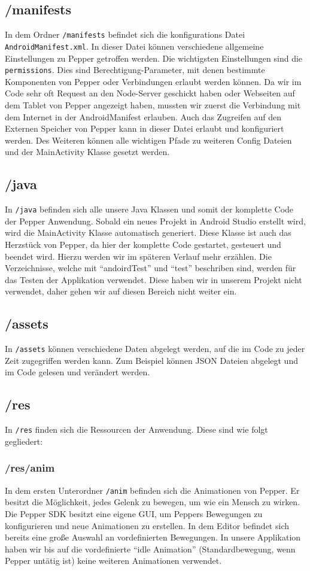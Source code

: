 \subsection*{/manifests}
In dem Ordner \verb|/manifests| befindet sich die konfigurations Datei \verb|AndroidManifest.xml|. In dieser Datei können verschiedene allgemeine Einstellungen zu Pepper getroffen werden. Die wichtigsten Einstellungen sind die \verb|permissions|. Dies sind Berechtigung-Parameter, mit denen bestimmte Komponenten von Pepper oder Verbindungen erlaubt werden können. Da wir im Code sehr oft Request an den Node-Server geschickt haben oder Webseiten auf dem Tablet von Pepper angezeigt haben, mussten wir zuerst die Verbindung mit dem Internet in der AndroidManifest erlauben. Auch das Zugreifen auf den Externen Speicher von Pepper kann in dieser Datei erlaubt und konfiguriert werden. Des Weiteren können alle wichtigen Pfade zu weiteren Config Dateien und der MainActivity Klasse gesetzt werden.

\subsection*{/java}
In  \verb|/java| befinden sich alle unsere Java Klassen und somit der komplette Code der Pepper Anwendung. Sobald ein neues Projekt in Android Studio erstellt wird, wird die MainActivity Klasse automatisch generiert. Diese Klasse ist auch das Herzstück von Pepper, da hier der komplette Code gestartet, gesteuert und beendet wird. Hierzu werden wir im späteren Verlauf mehr erzählen. Die Verzeichnisse, welche mit ``andoirdTest'' und ``test'' beschriben sind, werden für das Testen der Applikation verwendet. Diese haben wir in unserem Projekt nicht verwendet, daher gehen wir auf diesen Bereich nicht weiter ein.

\subsection*{/assets}
In \verb|/assets| können verschiedene Daten abgelegt werden, auf die im Code zu jeder Zeit zugegriffen werden kann. Zum Beispiel können JSON Dateien abgelegt und im Code gelesen und verändert werden.

\subsection*{/res}
In \verb|/res| finden sich die Ressourcen der Anwendung. Diese sind wie folgt gegliedert:

\subsubsection*{/res/anim}
In dem ersten Unterordner \verb|/anim| befinden sich die Animationen von Pepper. Er besitzt die Möglichkeit, jedes Gelenk zu bewegen, um wie ein Mensch zu wirken. Die Pepper SDK besitzt eine eigene GUI, um Peppers Bewegungen zu konfigurieren und neue Animationen zu erstellen. In dem Editor befindet sich bereits eine große Auswahl an vordefinierten Bewegungen. In unsere Applikation haben wir bis auf die vordefinierte 
``idle Animation''  (Standardbewegung, wenn Pepper untätig ist) keine weiteren Animationen verwendet.

